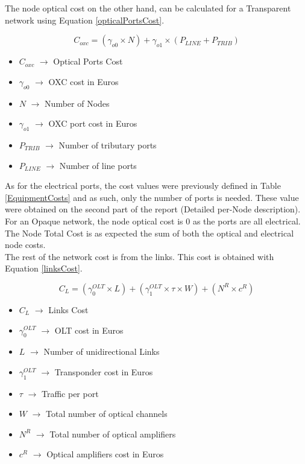 \documentclass[12pt, a4paper]{article}
\begin{document}
	The node optical cost on the other hand, can be calculated for a Transparent network using Equation \ref{opticalPortsCost}.
	
	\begin{equation}
		C_{oxc} = \left(\gamma_{o0} \times N \right) + \gamma_{o1} \times  \left(P_{LINE} + P_{TRIB}\right)
		\label{opticalPortsCost}
	\end{equation}	
	
	\begin{itemize}
		\item{$C_{oxc}$		$\rightarrow$	Optical Ports Cost}
		\item{$\gamma_{o0}$	$\rightarrow$	OXC cost in Euros}
		\item{$N$			$\rightarrow$	Number of Nodes}
		\item{$\gamma_{o1}$	$\rightarrow$	OXC port cost in Euros}
		\item{$P_{TRIB}	$	$\rightarrow$	Number of tributary ports}
		\item{$P_{LINE} $	$\rightarrow$	Number of line ports}
	\end{itemize}
		
	As for the electrical ports, the cost values were previously defined in Table \ref{EquipmentCosts} and as such, only the number of ports is needed. These value were obtained on the second part of the report (Detailed per-Node description). \\
	
	For an Opaque network, the node optical cost is 0 as the ports are all electrical. \\
	
	The Node Total Cost is as expected the sum of both the optical and electrical node costs. \\
	
	The rest of the network cost is from the links. This cost is obtained with Equation \ref{linksCost}.
	
	\begin{equation}
		C_L = \left(\gamma_0^{OLT} \times L\right) + \left(\gamma_1^{OLT} \times \tau \times W\right) + \left(N^R \times c^R\right)
		\label{linksCost}
	\end{equation}	
	
	\begin{itemize}
		\item{$C_L$				$\rightarrow$	Links Cost}
		\item{$\gamma_0^{OLT}$	$\rightarrow$	OLT cost in Euros}
		\item{$L$				$\rightarrow$	Number of unidirectional Links}
		\item{$\gamma_1^{OLT}$	$\rightarrow$	Transponder cost in Euros}
		\item{$\tau$			$\rightarrow$	Traffic per port}
		\item{$W$				$\rightarrow$	Total number of optical channels}
		\item{$N^R$				$\rightarrow$	Total number of optical amplifiers}
		\item{$c^R$				$\rightarrow$	Optical amplifiers cost in Euros}
	\end{itemize}
	
\end{document}
